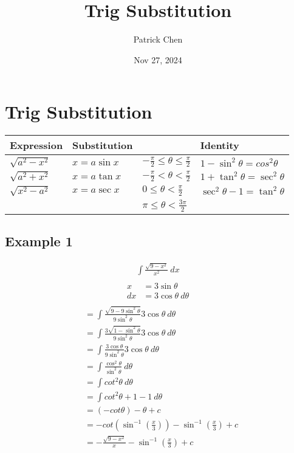 \documentclass{article}
\title{Trig Substitution}
\author{Patrick Chen}
\date{Nov 27, 2024}
\theoremstyle{mytheoremstyle}
\theoremstyle{mytheoremstyle}
\theoremstyle{myproblemstyle}
\begin{document}
    \maketitle
    \section*{Trig Substitution}
    \begin{center}
        \renewcommand{\arraystretch}{2}
        \begin{tabular}[c]{l|l l|l}
            \hline
            Expression & Substitution & & Identity \\
            \hline
            $\sqrt{a^2-x^2}$ & $x=a\sin x$ & $-\frac{\pi}{2}\le\theta\le\frac{\pi}{2}$ & $1-\sin^2 \theta = cos^2 \theta$ \\
            \hline
            $\sqrt{a^2+x^2}$ & $x=a\tan x$ & $-\frac{\pi}{2}<\theta<\frac{\pi}{2}$ & $1 + \tan^2\theta = \sec^2\theta$ \\
            \hline
            $\sqrt{x^2-a^2}$ & $x=a\sec x$ & $0\le\theta<\frac{\pi}{2}$ & $\sec^2\theta - 1 = \tan^2\theta$ \\
            &  & $\pi\le\theta<\frac{3\pi}{2}$ & \\
            \hline
        \end{tabular}
    \end{center}


    \subsection*{Example 1}
    \begin{align*}
        \int \frac{\sqrt{9-x^2}}{x^2} \ dx \\
    \end{align*}
    \begin{align*}
        x &= 3\sin \theta \\
        dx &= 3\cos \theta\ d\theta \\
    \end{align*}
    \begin{align*}
        &= \int \frac{\sqrt{9-9\sin^2\theta}}{9\sin^2 \theta} 3\cos \theta \ d\theta \\
        &= \int \frac{3\sqrt{1-\sin^2\theta}}{9\sin^2 \theta} 3\cos \theta \ d\theta \\
        &= \int \frac{3\cos \theta}{9\sin^2 \theta} 3\cos \theta \ d\theta \\
        &= \int \frac{\cos^2 \theta}{\sin^2 \theta} \ d\theta \\
        &= \int cot^2 \theta \ d\theta \\
        &= \int cot^2 \theta + 1 - 1\ d\theta \\
        &= (-cot \theta) - \theta + c\\
        &= -cot (\sin^{-1}(\frac{x}{3})) - \sin^{-1}(\frac{x}{3}) + c \\
        &= -\frac{\sqrt{9-x^2}}{x} - \sin^{-1}(\frac{x}{3}) + c
    \end{align*}
\end{document}
